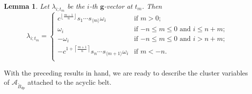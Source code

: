 \documentclass[12pt]{amsart}
\newcommand{\cA}{\mathcal{A}}
\newcommand{\bfg}{\mathbf{g}}
\renewcommand{\mod}[1]{\langle {#1} \rangle}
\newcommand{\Bdp}{\widetilde{B}_{dp}}
\newtheorem{lemma}[theorem]{Lemma}
\theoremstyle{remark}
\numberwithin{equation}{section}
\numberwithin{figure}{section}
\begin{document}
\begin{lemma}
  \label{lemma:g-vectors}
  Let $\lambda_{i;t_m}$ be the $i$-th $\bfg$-vector at $t_m$. 
  Then
  \begin{equation}
    \lambda_{i;t_m}
    =
    \begin{cases}
      c^{\left\lfloor\frac{m-1}{n}\right\rfloor}s_1\cdots s_{\mod{m}} \omega_i & \text{if $m>0$;}\\
      \omega_i & \text{if $-n\leq m \leq 0$ and  $i\leq n+m$;} \\
      -\omega_i & \text{if $-n\leq m \leq 0$ and $i>n+m$;} \\
      -c^{1+\left\lceil\frac{m+1}{n}\right\rceil}s_n\cdots s_{\mod{m+1}} \omega_i & \text{if $m <-n$.}\\
    \end{cases}
  \end{equation}
\end{lemma}

With the preceding results in hand, we are ready to describe the cluster variables of $\cA_{\Bdp}$ attached to the acyclic belt.
\end{document}
